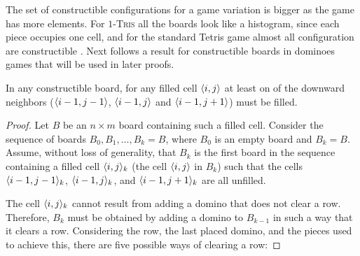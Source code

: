 The set of constructible configurations for a game variation is bigger as the game has more elements. For $1$\textsc{-Tris} all the boards look like a histogram, since each piece occupies one cell, and for the standard Tetris game almost all configuration are constructible \cite{HCTC}. Next follows a result for constructible boards in dominoes games that will be used in later proofs.

\begin{lemma0} \label{lem:floating}
  In any constructible board, for any filled cell $\cell$ at least on of the downward neighbors ($\cell[i-1][j-1]$, $\cell[i-1][j]$ and $\cell[i-1][j+1]$) must be filled.
\end{lemma0}  

\begin{proof}  
Let \(B\) be an \(n \times m\) board containing such a filled cell. Consider the sequence of boards \(B_0, B_1, \dots, B_k = B\), where \(B_0\) is an empty board and \(B_k = B\). Assume, without loss of generality, that \(B_k\) is the first board in the sequence containing a filled cell \(\cell_k\) (the cell \(\cell\) in \(B_k\)) such that the cells \(\cell[i-1][j-1]_k\), \(\cell[i-1][j]_k\), and \(\cell[i-1][j+1]_k\) are all unfilled.


The cell \(\cell_k\) cannot result from adding a domino that does not clear a row. Therefore, \(B_k\) must be obtained by adding a domino to \(B_{k-1}\) in such a way that it clears a row. Considering the row, the last placed domino, and the pieces used to achieve this, there are five possible ways of clearing a row:


\end{proof}
